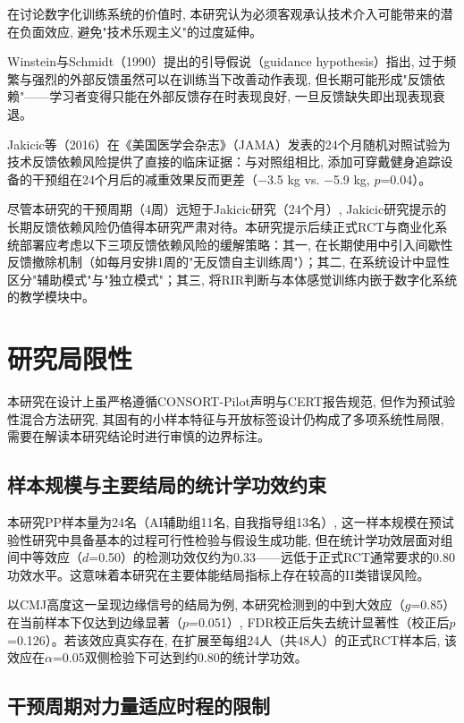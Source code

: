 在讨论数字化训练系统的价值时, 本研究认为必须客观承认技术介入可能带来的潜在负面效应, 避免"技术乐观主义"的过度延伸。

Winstein与Schmidt（1990）提出的引导假说（guidance hypothesis）指出, 过于频繁与强烈的外部反馈虽然可以在训练当下改善动作表现, 但长期可能形成"反馈依赖"——学习者变得只能在外部反馈存在时表现良好, 一旦反馈缺失即出现表现衰退。

Jakicic等（2016）在《美国医学会杂志》（JAMA）发表的24个月随机对照试验为技术反馈依赖风险提供了直接的临床证据：与对照组相比, 添加可穿戴健身追踪设备的干预组在24个月后的减重效果反而更差（$-$3.5 kg vs. $-$5.9 kg, $p$=0.04）。

尽管本研究的干预周期（4周）远短于Jakicic研究（24个月）, Jakicic研究提示的长期反馈依赖风险仍值得本研究严肃对待。本研究提示后续正式RCT与商业化系统部署应考虑以下三项反馈依赖风险的缓解策略：其一, 在长期使用中引入间歇性反馈撤除机制（如每月安排1周的"无反馈自主训练周"）；其二, 在系统设计中显性区分"辅助模式"与"独立模式"；其三, 将RIR判断与本体感觉训练内嵌于数字化系统的教学模块中。

\section{研究局限性}
\label{sec:limitations}

本研究在设计上虽严格遵循CONSORT-Pilot声明与CERT报告规范, 但作为预试验性混合方法研究, 其固有的小样本特征与开放标签设计仍构成了多项系统性局限, 需要在解读本研究结论时进行审慎的边界标注。

\subsection{样本规模与主要结局的统计学功效约束}
\label{sec:sample_power}

本研究PP样本量为24名（AI辅助组11名, 自我指导组13名）, 这一样本规模在预试验性研究中具备基本的过程可行性检验与假设生成功能, 但在统计学功效层面对组间中等效应（$d$=0.50）的检测功效仅约为0.33——远低于正式RCT通常要求的0.80功效水平。这意味着本研究在主要体能结局指标上存在较高的II类错误风险。

以CMJ高度这一呈现边缘信号的结局为例, 本研究检测到的中到大效应（$g$=0.85）在当前样本下仅达到边缘显著（$p$=0.051）, FDR校正后失去统计显著性（校正后$p$=0.126）。若该效应真实存在, 在扩展至每组24人（共48人）的正式RCT样本后, 该效应在$\alpha$=0.05双侧检验下可达到约0.80的统计学功效。

\subsection{干预周期对力量适应时程的限制}
\label{sec:intervention_duration}

